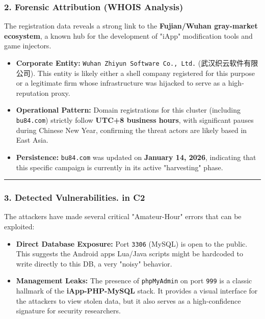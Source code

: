 \documentclass[
]{article}
\begin{document}
\subsubsection{2. Forensic Attribution (WHOIS
Analysis)}\label{2-forensic-attribution-whois-analysis-2}

The registration data reveals a strong link to the \textbf{Fujian/Wuhan
gray-market ecosystem}, a known hub for the development of "iApp"
modification tools and game injectors.

\begin{itemize}
\item
  \textbf{Corporate Entity:}
  \texttt{Wuhan\ Zhiyun\ Software\ Co.,\ Ltd.} (武汉织云软件有限公司).
  This entity is likely either a shell company registered for this
  purpose or a legitimate firm whose infrastructure was hijacked to
  serve as a high-reputation proxy.
\item
  \textbf{Operational Pattern:} Domain registrations for this cluster
  (including \texttt{bu84.com}) strictly follow \textbf{UTC+8 business
  hours}, with significant pauses during Chinese New Year, confirming
  the threat actors are likely based in East Asia.
\item
  \textbf{Persistence:} \texttt{bu84.com} was updated on \textbf{January
  14, 2026}, indicating that this specific campaign is currently in its
  active "harvesting" phase.
\end{itemize}

\begin{center}\rule{0.5\linewidth}{0.5pt}\end{center}

\subsubsection{3. Detected Vulnerabilities. in
C2}\label{3-detected-vulnerabilities-in-c2-2}

The attackers have made several critical "Amateur-Hour" errors that can
be exploited:

\begin{itemize}
\item
  \textbf{Direct Database Exposure:} Port \texttt{3306} (MySQL) is open
  to the public. This suggests the Android app\textquotesingle s
  Lua/Java scripts might be hardcoded to write directly to this DB, a
  very "noisy" behavior.
\item
  \textbf{Management Leaks:} The presence of \texttt{phpMyAdmin} on port
  \texttt{999} is a classic hallmark of the \textbf{iApp-PHP-MySQL}
  stack. It provides a visual interface for the attackers to view stolen
  data, but it also serves as a high-confidence signature for security
  researchers.
\end{itemize}
\end{document}
